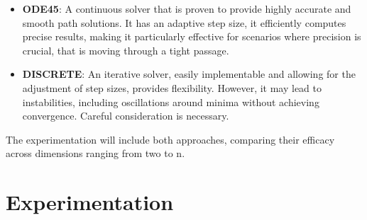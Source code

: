 \documentclass{IEEEtaes}
\newcommand{\algrule}[1][.1pt]{\par\vskip.2\baselineskip\hrule height #1\par\vskip.5\baselineskip}
\begin{document}
{\begin{itemize}
    \item \textbf{ODE45}: A continuous solver that is proven to provide highly accurate and smooth path solutions. It has an adaptive step size, it efficiently computes precise results, making it particularly effective for scenarios where precision is crucial, that is moving through a tight passage. 
    \item \textbf{DISCRETE}: An iterative solver, easily implementable and allowing for the adjustment of step sizes, provides flexibility. However, it may lead to instabilities, including oscillations around minima without achieving convergence. Careful consideration is necessary.
\end{itemize}

The experimentation will include both approaches, comparing their efficacy across dimensions ranging from two to n.




\section{\large \textbf{Experimentation}}





}
\end{document}
